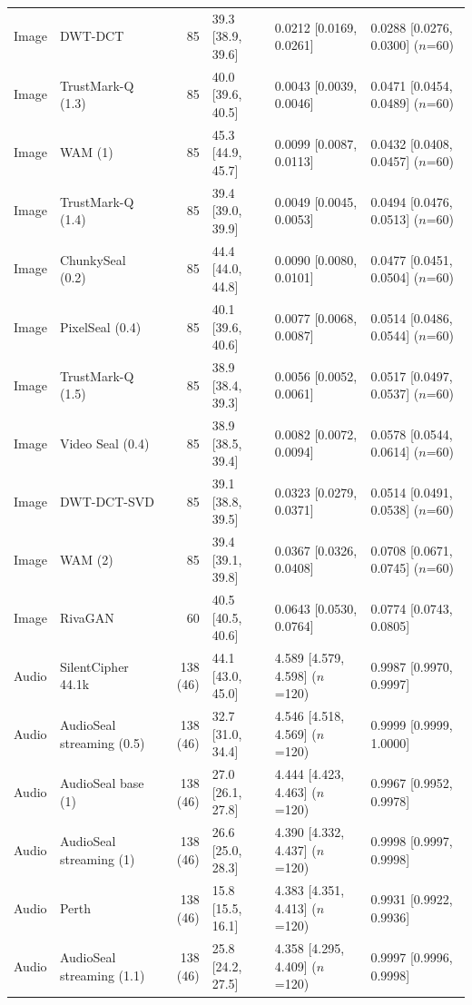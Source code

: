 \begin{table}[!t]
\begin{tabular}{llrlll}
Image & DWT-DCT & 85 & 39.3 [38.9, 39.6] & 0.0212 [0.0169, 0.0261] & 0.0288 [0.0276, 0.0300] \tiny($n$=60) \\
Image & TrustMark-Q (1.3) & 85 & 40.0 [39.6, 40.5] & 0.0043 [0.0039, 0.0046] & 0.0471 [0.0454, 0.0489] \tiny($n$=60) \\
Image & WAM (1) & 85 & 45.3 [44.9, 45.7] & 0.0099 [0.0087, 0.0113] & 0.0432 [0.0408, 0.0457] \tiny($n$=60) \\
Image & TrustMark-Q (1.4) & 85 & 39.4 [39.0, 39.9] & 0.0049 [0.0045, 0.0053] & 0.0494 [0.0476, 0.0513] \tiny($n$=60) \\
Image & ChunkySeal (0.2) & 85 & 44.4 [44.0, 44.8] & 0.0090 [0.0080, 0.0101] & 0.0477 [0.0451, 0.0504] \tiny($n$=60) \\
Image & PixelSeal (0.4) & 85 & 40.1 [39.6, 40.6] & 0.0077 [0.0068, 0.0087] & 0.0514 [0.0486, 0.0544] \tiny($n$=60) \\
Image & TrustMark-Q (1.5) & 85 & 38.9 [38.4, 39.3] & 0.0056 [0.0052, 0.0061] & 0.0517 [0.0497, 0.0537] \tiny($n$=60) \\
Image & Video Seal (0.4) & 85 & 38.9 [38.5, 39.4] & 0.0082 [0.0072, 0.0094] & 0.0578 [0.0544, 0.0614] \tiny($n$=60) \\
Image & DWT-DCT-SVD & 85 & 39.1 [38.8, 39.5] & 0.0323 [0.0279, 0.0371] & 0.0514 [0.0491, 0.0538] \tiny($n$=60) \\
Image & WAM (2) & 85 & 39.4 [39.1, 39.8] & 0.0367 [0.0326, 0.0408] & 0.0708 [0.0671, 0.0745] \tiny($n$=60) \\
Image & RivaGAN & 60 & 40.5 [40.5, 40.6] & 0.0643 [0.0530, 0.0764] & 0.0774 [0.0743, 0.0805] \\
\midrule
Audio & SilentCipher 44.1k & 138 (46) & 44.1 [43.0, 45.0] & 4.589 [4.579, 4.598] \tiny($n$=120) & 0.9987 [0.9970, 0.9997] \\
Audio & AudioSeal streaming (0.5) & 138 (46) & 32.7 [31.0, 34.4] & 4.546 [4.518, 4.569] \tiny($n$=120) & 0.9999 [0.9999, 1.0000] \\
Audio & AudioSeal base (1) & 138 (46) & 27.0 [26.1, 27.8] & 4.444 [4.423, 4.463] \tiny($n$=120) & 0.9967 [0.9952, 0.9978] \\
Audio & AudioSeal streaming (1) & 138 (46) & 26.6 [25.0, 28.3] & 4.390 [4.332, 4.437] \tiny($n$=120) & 0.9998 [0.9997, 0.9998] \\
Audio & Perth & 138 (46) & 15.8 [15.5, 16.1] & 4.383 [4.351, 4.413] \tiny($n$=120) & 0.9931 [0.9922, 0.9936] \\
Audio & AudioSeal streaming (1.1) & 138 (46) & 25.8 [24.2, 27.5] & 4.358 [4.295, 4.409] \tiny($n$=120) & 0.9997 [0.9996, 0.9998] \\

\end{tabular}
\end{table}

